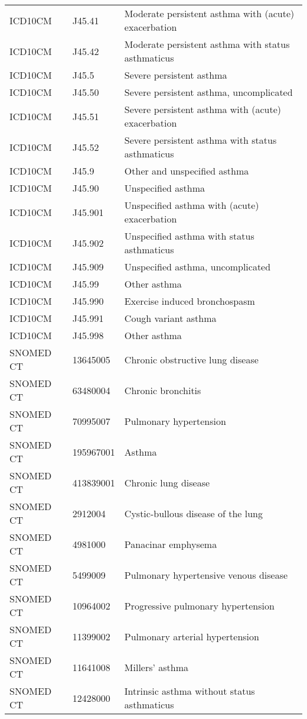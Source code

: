 \begin{table}[ht]
\begin{tabular}{lll}
  ICD10CM & J45.41 & Moderate persistent asthma with (acute) exacerbation \\ 
  ICD10CM & J45.42 & Moderate persistent asthma with status asthmaticus \\ 
  ICD10CM & J45.5 & Severe persistent asthma \\ 
  ICD10CM & J45.50 & Severe persistent asthma, uncomplicated \\ 
  ICD10CM & J45.51 & Severe persistent asthma with (acute) exacerbation \\ 
  ICD10CM & J45.52 & Severe persistent asthma with status asthmaticus \\ 
  ICD10CM & J45.9 & Other and unspecified asthma \\ 
  ICD10CM & J45.90 & Unspecified asthma \\ 
  ICD10CM & J45.901 & Unspecified asthma with (acute) exacerbation \\ 
  ICD10CM & J45.902 & Unspecified asthma with status asthmaticus \\ 
  ICD10CM & J45.909 & Unspecified asthma, uncomplicated \\ 
  ICD10CM & J45.99 & Other asthma \\ 
  ICD10CM & J45.990 & Exercise induced bronchospasm \\ 
  ICD10CM & J45.991 & Cough variant asthma \\ 
  ICD10CM & J45.998 & Other asthma \\ 
  SNOMED CT & 13645005 & Chronic obstructive lung disease \\ 
  SNOMED CT & 63480004 & Chronic bronchitis \\ 
  SNOMED CT & 70995007 & Pulmonary hypertension \\ 
  SNOMED CT & 195967001 & Asthma \\ 
  SNOMED CT & 413839001 & Chronic lung disease \\ 
  SNOMED CT & 2912004 & Cystic-bullous disease of the lung \\ 
  SNOMED CT & 4981000 & Panacinar emphysema \\ 
  SNOMED CT & 5499009 & Pulmonary hypertensive venous disease \\ 
  SNOMED CT & 10964002 & Progressive pulmonary hypertension \\ 
  SNOMED CT & 11399002 & Pulmonary arterial hypertension \\ 
  SNOMED CT & 11641008 & Millers' asthma \\ 
  SNOMED CT & 12428000 & Intrinsic asthma without status asthmaticus \\ 

\end{tabular}
\end{table}
